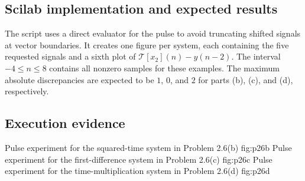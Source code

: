 \subsection{Scilab implementation and expected results}
The script uses a direct evaluator for the pulse to avoid truncating
shifted signals at vector boundaries. It creates one figure per system,
each containing the five requested signals and a sixth plot of
$\mathcal{T}[x_2](n)-y(n-2)$. The interval $-4\leq n\leq8$ contains
all nonzero samples for these examples. The maximum absolute
discrepancies are expected to be $1$, $0$, and $2$ for parts (b), (c),
and (d), respectively.


\subsection{Execution evidence}
  {Pulse experiment for the squared-time system in Problem 2.6(b)}
  {fig:p26b}
  {Pulse experiment for the first-difference system in Problem 2.6(c)}
  {fig:p26c}
  {Pulse experiment for the time-multiplication system in Problem 2.6(d)}
  {fig:p26d}
